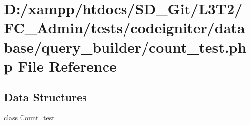\hypertarget{_admin_2tests_2codeigniter_2database_2query__builder_2count__test_8php}{}\section{D\+:/xampp/htdocs/\+S\+D\+\_\+\+Git/\+L3\+T2/\+F\+C\+\_\+\+Admin/tests/codeigniter/database/query\+\_\+builder/count\+\_\+test.php File Reference}
\label{_admin_2tests_2codeigniter_2database_2query__builder_2count__test_8php}
\subsection*{Data Structures}
\begin{DoxyCompactItemize}
\item 
class \hyperlink{class_count__test}{Count\+\_\+test}
\end{DoxyCompactItemize}
